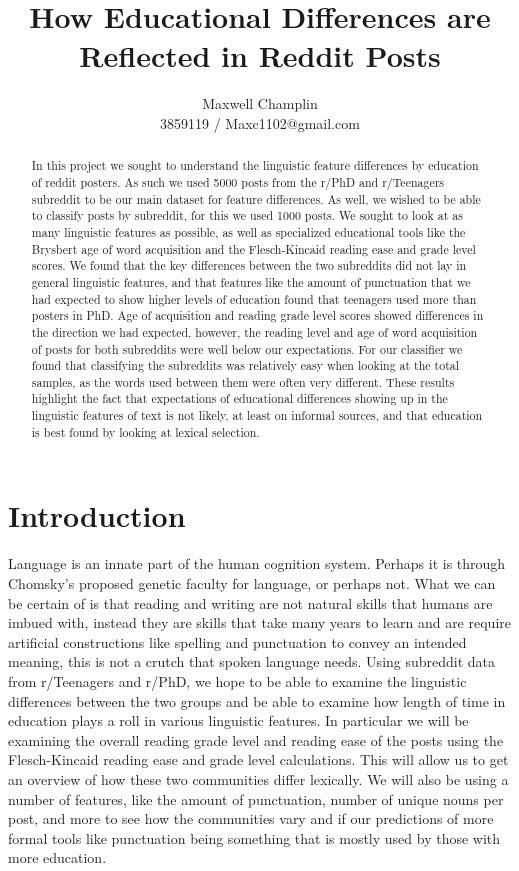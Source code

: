 \documentclass[11pt]{article}
\title{How Educational Differences are Reflected in Reddit Posts}
\author{Maxwell Champlin \\
  3859119 / Maxc1102@gmail.com \\}
\begin{document}
\maketitle
\begin{abstract}
In this project we sought to understand the linguistic feature differences by education of reddit posters. As such we used 5000 posts from the r/PhD and r/Teenagers subreddit to be our main dataset for feature differences. As well, we wished to be able to classify posts by subreddit, for this we used 1000 posts. We sought to look at as many linguistic features as possible, as well as specialized educational tools like the Brysbert age of word acquisition and the Flesch-Kincaid reading ease and grade level scores. We found that the key differences between the two subreddits did not lay in general linguistic features, and that features like the amount of punctuation that we had expected to show higher levels of education found that teenagers used more than posters in PhD. Age of acquisition and reading grade level scores showed differences in the direction we had expected, however, the reading level and age of word acquisition of posts for both subreddits were well below our expectations. For our classifier we found that classifying the subreddits was relatively easy when looking at the total samples, as the words used between them were often very different. These results highlight the fact that expectations of educational differences showing up in the linguistic features of text is not likely, at least on informal sources, and that education is best found by looking at lexical selection. 
\end{abstract}

\section{Introduction}


Language is an innate part of the human cognition system. Perhaps it is through Chomsky's proposed genetic faculty for language, or perhaps not. What we can be certain of is that reading and writing are not natural skills that humans are imbued with, instead they are skills that take many years to learn and are require artificial constructions like spelling and punctuation to convey an intended meaning, this is not a crutch that spoken language needs. Using subreddit data from r/Teenagers and r/PhD, we hope to be able to examine the linguistic differences between the two groups and be able to examine how length of time in education plays a roll in various linguistic features. In particular we will be examining the overall reading grade level and reading ease of the posts using the Flesch-Kincaid reading ease and grade level calculations. This will allow us to get an overview of how these two communities differ lexically. We will also be using a number of features, like the amount of punctuation, number of unique nouns per post, and more to see how the communities vary and if our predictions of more formal tools like punctuation being something that is mostly used by those with more education. 
\end{document}
